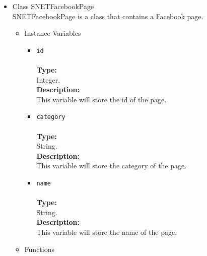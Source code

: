 \begin{itemize}
\begin{itemize}
\begin{itemize}
\end{itemize} %
\end{itemize} %

\item Class SNETFacebookPage\\
\label{sec-1-4-2-7}%
SNETFacebookPage is a class that contains a Facebook page.
   
\begin{itemize}

\item Instance Variables
\label{sec-1-4-2-7-1}%
\begin{itemize}
\item \verb~id~\\\\
\textbf{Type:}\\
     Integer.\\

     \textbf{Description:}\\
     This variable will store the id of the page.\\
\item \verb~category~\\\\
\textbf{Type:}\\
     String.\\

     \textbf{Description:}\\
     This variable will store the category of the page.\\
\item \verb~name~\\\\
\textbf{Type:}\\
     String.\\

     \textbf{Description:}\\
     This variable will store the name of the page.
\end{itemize}


\item Functions
\label{sec-1-4-2-7-2}%
\begin{itemize}


\end{itemize}
\end{itemize}
\end{itemize}
